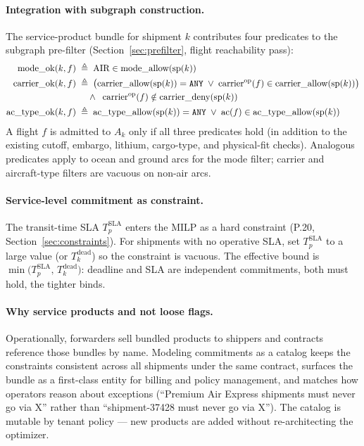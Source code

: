 \documentclass[11pt,a4paper]{article}
\newcommand{\defeq}{\triangleq}
\theoremstyle{definition}
\begin{document}
\paragraph{Integration with subgraph construction.}
The service-product bundle for shipment $k$ contributes four predicates to the
subgraph pre-filter (Section~\ref{sec:prefilter}, flight reachability pass):
\begin{align}
  \text{mode\_ok}(k, f) \;&\defeq\; \text{AIR} \in \text{mode\_allow}(\text{sp}(k)) \label{eq:sp-mode-ok} \\
  \text{carrier\_ok}(k, f) \;&\defeq\;
    \bigl(\text{carrier\_allow}(\text{sp}(k)) = \texttt{ANY} \;\vee\; \text{carrier}^{\text{op}}(f) \in \text{carrier\_allow}(\text{sp}(k))\bigr) \notag \\
    & \quad \wedge \;\; \text{carrier}^{\text{op}}(f) \notin \text{carrier\_deny}(\text{sp}(k))
    \label{eq:sp-carrier-ok} \\
  \text{ac\_type\_ok}(k, f) \;&\defeq\;
    \text{ac\_type\_allow}(\text{sp}(k)) = \texttt{ANY} \;\vee\; \text{ac}(f) \in \text{ac\_type\_allow}(\text{sp}(k))
    \label{eq:sp-ac-ok}
\end{align}
A flight $f$ is admitted to $A_k$ only if all three predicates hold (in addition to
the existing cutoff, embargo, lithium, cargo-type, and physical-fit checks).
Analogous predicates apply to ocean and ground arcs for the mode filter; carrier and
aircraft-type filters are vacuous on non-air arcs.

\paragraph{Service-level commitment as constraint.}
The transit-time SLA $T_p^{\text{SLA}}$ enters the MILP as a hard constraint (P.20,
Section~\ref{sec:constraints}). For shipments with no operative SLA, set
$T_p^{\text{SLA}}$ to a large value (or $T_k^{\text{dead}}$) so the constraint is
vacuous. The effective bound is $\min\bigl(T_p^{\text{SLA}},\, T_k^{\text{dead}}\bigr)$:
deadline and SLA are independent commitments, both must hold, the tighter binds.

\paragraph{Why service products and not loose flags.}
Operationally, forwarders sell bundled products to shippers and contracts reference
those bundles by name. Modeling commitments as a catalog keeps the constraints
consistent across all shipments under the same contract, surfaces the bundle as a
first-class entity for billing and policy management, and matches how operators
reason about exceptions (``Premium Air Express shipments must never go via X''
rather than ``shipment-37428 must never go via X''). The catalog is mutable by
tenant policy --- new products are added without re-architecting the optimizer.
\end{document}
